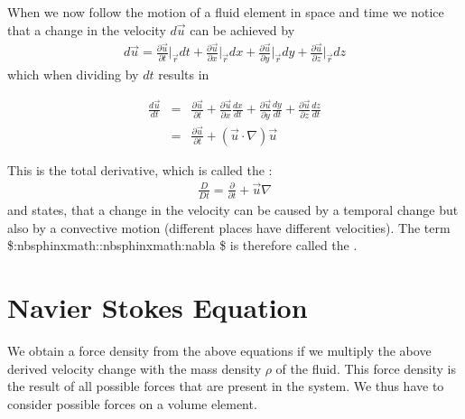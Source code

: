 \documentclass[letterpaper,10pt,english]{sphinxmanual}
\begin{document}
\sphinxAtStartPar
When we now follow the motion of a fluid element in space and time we notice that a change in the velocity \(d\vec{u}\) can be achieved by
\begin{equation*}
\begin{split}d\vec{u}=\frac{\partial \vec{u}}{\partial t}\bigg|_{\vec{r}}dt+\frac{\partial \vec{u}}{\partial x}\bigg|_{\vec{r}}dx+\frac{\partial \vec{u}}{\partial y}\bigg|_{\vec{r}}dy+\frac{\partial \vec{u}}{\partial z}\bigg|_{\vec{r}}dz\end{split}
\end{equation*}
\sphinxAtStartPar
which when dividing by \(dt\) results in

\sphinxAtStartPar
\begin{eqnarray}
\frac{d\vec{u}}{dt} &= &\frac{\partial \vec{u}}{\partial t}+\frac{\partial \vec{u}}{\partial x}\frac{dx}{dt}+\frac{\partial \vec{u}}{\partial y}\frac{dy}{dt}+\frac{\partial \vec{u}}{\partial z}\frac{dz}{dt}\\
&=& \frac{\partial \vec{u}}{\partial t}+(\vec{u}\cdot \nabla)\vec{u}
\end{eqnarray}

\sphinxAtStartPar
This is the total derivative, which is called the :
\begin{equation*}
\begin{split}\frac{D}{Dt}=\frac{\partial}{\partial t} + \vec{u}\nabla\end{split}
\end{equation*}
\sphinxAtStartPar
and states, that a change in the velocity can be caused by a temporal change but also by a convective motion (different places have different velocities). The term \$:nbsphinx\sphinxhyphen{}math::nbsphinx\sphinxhyphen{}math:{\color{red}\bfseries{}\textasciigrave{}}nabla {\color{red}\bfseries{}\textasciigrave{}}\$ is therefore called the .


\section{Navier Stokes Equation}
\label{\detokenize{notebooks/L17/1_hydrodynamics:Navier-Stokes-Equation}}
\sphinxAtStartPar
We obtain a force density from the above equations if we multiply the above derived velocity change with the mass density \(\rho\) of the fluid. This force density is the result of all possible forces that are present in the system. We thus have to consider possible forces on a volume element.
\end{document}
